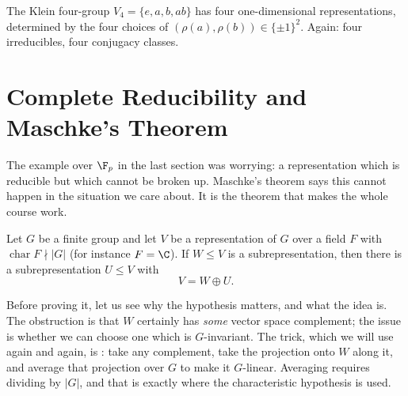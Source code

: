\begin{example}[$C_2 \times C_2$]
	The Klein four-group $V_4 = \{e, a, b, ab\}$ has four one-dimensional representations, determined by the four choices of $(\rho(a), \rho(b)) \in \{\pm 1\}^2$. Again: four irreducibles, four conjugacy classes.
\end{example}

\section{Complete Reducibility and Maschke's Theorem}

The example over $\F_p$ in the last section was worrying: a representation which is reducible but which cannot be broken up. Maschke's theorem says this cannot happen in the situation we care about. It is the theorem that makes the whole course work.

\begin{theorem}
	Let $G$ be a finite group and let $V$ be a representation of $G$ over a field $F$ with $\operatorname{char} F \nmid |G|$ (for instance $F = \C$). If $W \leq V$ is a subrepresentation, then there is a subrepresentation $U \leq V$ with
	$$V = W \oplus U.$$
\end{theorem}

Before proving it, let us see why the hypothesis matters, and what the idea is. The obstruction is that $W$ certainly has \emph{some} vector space complement; the issue is whether we can choose one which is $G$-invariant. The trick, which we will use again and again, is : take any complement, take the projection onto $W$ along it, and average that projection over $G$ to make it $G$-linear. Averaging requires dividing by $|G|$, and that is exactly where the characteristic hypothesis is used.

